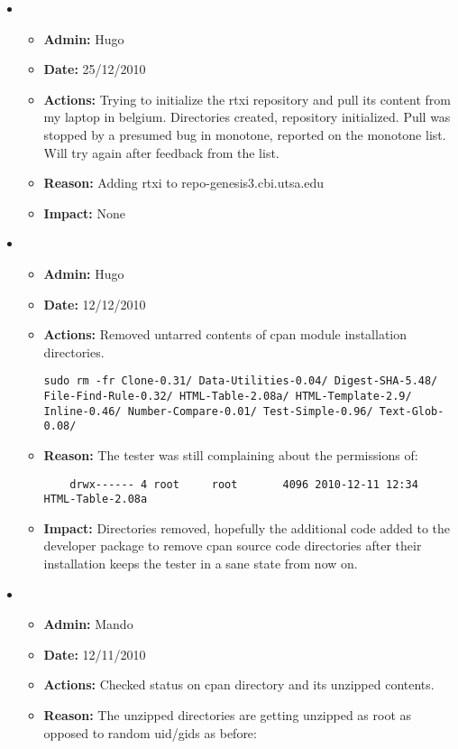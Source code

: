 \documentclass[12pt]{article}
\begin{document}
\begin{itemize}
\item
\begin{itemize}
\item[] {\bf Admin:} Hugo
\item[] {\bf Date:} 25/12/2010 
\item[] {\bf Actions:} Trying to initialize the rtxi repository and
  pull its content from my laptop in belgium.  Directories created,
  repository initialized.  Pull was stopped by a presumed bug in
  monotone, reported on the monotone list.  Will try again after
  feedback from the list.
\item[] {\bf Reason:} Adding rtxi to repo-genesis3.cbi.utsa.edu
\item[] {\bf Impact:} None
\end{itemize}


\item
\begin{itemize}
\item[] {\bf Admin:} Hugo
\item[] {\bf Date:} 12/12/2010 
\item[] {\bf Actions:} Removed untarred contents of cpan module installation directories.
\begin{verbatim}
sudo rm -fr Clone-0.31/ Data-Utilities-0.04/ Digest-SHA-5.48/ File-Find-Rule-0.32/ HTML-Table-2.08a/ HTML-Template-2.9/ Inline-0.46/ Number-Compare-0.01/ Test-Simple-0.96/ Text-Glob-0.08/
\end{verbatim}
\item[] {\bf Reason:} The tester was still complaining about the permissions of:
\begin{verbatim}
	drwx------ 4 root     root       4096 2010-12-11 12:34 HTML-Table-2.08a
\end{verbatim}

\item[] {\bf Impact:} Directories removed, hopefully the additional
  code added to the developer package to remove cpan source code
  directories after their installation keeps the tester in a sane
  state from now on.
\end{itemize}


\item
\begin{itemize}
\item[] {\bf Admin:} Mando
\item[] {\bf Date:} 12/11/2010 
\item[] {\bf Actions:} Checked status on cpan directory and its unzipped contents.
\item[] {\bf Reason:} The unzipped directories are getting unzipped as root as opposed to random uid/gids as before:


\end{itemize}
\end{itemize}
\end{document}
